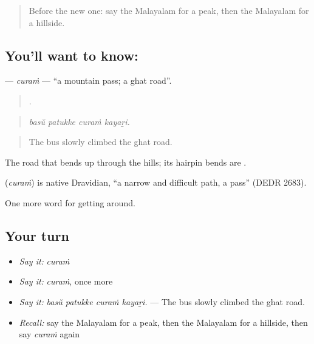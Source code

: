 \label{lesson:ML-C495-curam}



\begin{quote}
Before the new one: say the Malayalam for a peak, then the Malayalam for a hillside.
\end{quote}

\subsection*{You'll want to know: }
\textbf{} — \emph{curaṁ} — \textquotedblleft{}a mountain pass; a ghat road\textquotedblright{}.

\begin{quote}
   .
\end{quote}

\begin{quote}
\emph{basŭ patukke curaṁ kayaṟi.}
\end{quote}

\begin{quote}
The bus slowly climbed the ghat road.
\end{quote}

The road that bends up through the hills; its hairpin bends are  .

\begin{cousinweb}
\textbf{} (\emph{curaṁ}) is native Dravidian, \textquotedblleft{}a narrow and difficult path, a pass\textquotedblright{} (DEDR 2683).
\end{cousinweb}

\begin{grammarlens}[title={What you've built}]
One more word for getting around.
\end{grammarlens}

\subsection*{Your turn}
\begin{itemize}
\raggedright
  \item \emph{Say it:} \emph{curaṁ}
  \item \emph{Say it:} \emph{curaṁ}, once more
  \item \emph{Say it:} \emph{basŭ patukke curaṁ kayaṟi.} — The bus slowly climbed the ghat road.
  \item \emph{Recall:} say the Malayalam for a peak, then the Malayalam for a hillside, then say \emph{curaṁ} again
\end{itemize}

